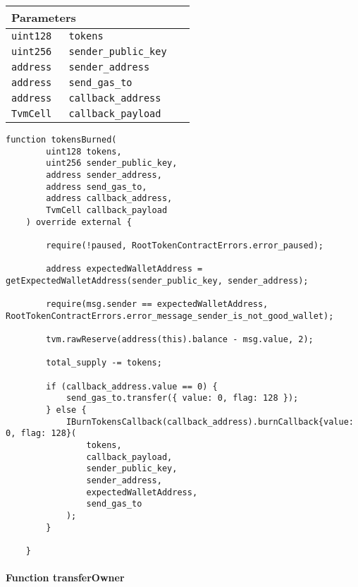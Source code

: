 \ifsoltables
\noindent\begin{tabular}{|l|l|p{5cm}|}\hline
\multicolumn{3}{|l|}{\bf Parameters}\\\hline
\tt uint128 & \tt tokens &\\\hline
\tt uint256 & \tt sender\_{}public\_{}key &\\\hline
\tt address & \tt sender\_{}address &\\\hline
\tt address & \tt send\_{}gas\_{}to &\\\hline
\tt address & \tt callback\_{}address &\\\hline
\tt TvmCell & \tt callback\_{}payload &\\\hline
\end{tabular}
\fi

\vspace{2cm}

\begin{lstlisting}[firstnumber=347]
    function tokensBurned(
        uint128 tokens,
        uint256 sender_public_key,
        address sender_address,
        address send_gas_to,
        address callback_address,
        TvmCell callback_payload
    ) override external {

        require(!paused, RootTokenContractErrors.error_paused);

        address expectedWalletAddress = getExpectedWalletAddress(sender_public_key, sender_address);

        require(msg.sender == expectedWalletAddress, RootTokenContractErrors.error_message_sender_is_not_good_wallet);

        tvm.rawReserve(address(this).balance - msg.value, 2);

        total_supply -= tokens;

        if (callback_address.value == 0) {
            send_gas_to.transfer({ value: 0, flag: 128 });
        } else {
            IBurnTokensCallback(callback_address).burnCallback{value: 0, flag: 128}(
                tokens,
                callback_payload,
                sender_public_key,
                sender_address,
                expectedWalletAddress,
                send_gas_to
            );
        }

    }
\end{lstlisting}

\paragraph{Function transferOwner}



